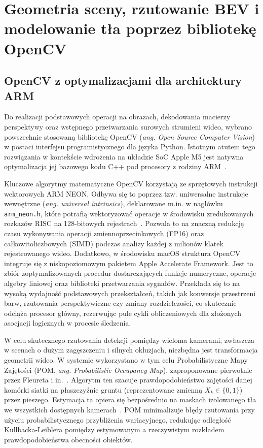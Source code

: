 \section{Geometria sceny, rzutowanie BEV i modelowanie tła poprzez bibliotekę OpenCV}

\subsection{OpenCV z optymalizacjami dla architektury ARM}

Do realizacji podstawowych operacji na obrazach, dekodowania macierzy perspektywy oraz wstępnego
przetwarzania surowych strumieni wideo, wybrano powszechnie stosowaną bibliotekę OpenCV
(\textit{ang. Open Source Computer Vision}) w postaci interfejsu programistycznego dla języka
Python. Istotnym atutem tego rozwiązania w kontekście wdrożenia na układzie SoC Apple M5 jest
natywna optymalizacja jej bazowego kodu C++ pod procesory z rodziny ARM~\cite{opencv_changelog}.

Kluczowe algorytmy matematyczne OpenCV korzystają ze sprzętowych instrukcji wektorowych ARM NEON.
Odbywa się to poprzez tzw. uniwersalne instrukcje wewnętrzne (\textit{ang. universal intrinsics}),
deklarowane m.in. w nagłówku \texttt{arm\_neon.h}, które potrafią wektoryzować operacje w
środowisku zredukowanych rozkazów RISC na 128-bitowych rejestrach~\cite{opencv_changelog}. Pozwala
to na znaczną redukcję czasu wykonywania operacji zmiennoprzecinkowych (FP16) oraz
całkowitoliczbowych (SIMD) podczas analizy każdej z milionów klatek rejestrowanego wideo.
Dodatkowo, w środowisku macOS struktura OpenCV integruje się z niskopoziomowym pakietem Apple
Accelerate Framework. Jest to zbiór zoptymalizowanych procedur dostarczających funkcje numeryczne,
operacje algebry liniowej oraz biblioteki przetwarzania sygnałów. Przekłada się to na wysoką
wydajność podstawowych przekształceń, takich jak konwersje przestrzeni barw, rzutowania
perspektywiczne czy zmiany rozdzielczości, co skutecznie odciąża procesor główny, rezerwując pule
cykli obliczeniowych dla złożonych asocjacji logicznych w procesie śledzenia.

W celu skutecznego rzutowania detekcji pomiędzy wieloma kamerami, zwłaszcza w scenach o dużym
zagęszczeniu i silnych okluzjach, niezbędna jest transformacja geometrii wideo. W systemie
wykorzystano w tym celu Probabilistyczne Mapy Zajętości (POM, \textit{ang. Probabilistic Occupancy
  Map}), zaproponowane pierwotnie przez Fleureta i in.~\cite{fleuret2008}. Algorytm ten szacuje
prawdopodobieństwo zajętości danej komórki siatki na płaszczyźnie gruntu (reprezentowane zmienną
$X_k \in \{0,1\}$) przez pieszego. Estymacja ta opiera się bezpośrednio na maskach izolowanego tła
we wszystkich dostępnych kamerach~\cite{fleuret2008}. POM minimalizuje błędy rzutowania przy użyciu
probabilistycznego przybliżenia wariacyjnego, redukując odległość Kullbacka-Leiblera pomiędzy
estymowanym a rzeczywistym rozkładem prawdopodobieństwa obecności obiektów.

